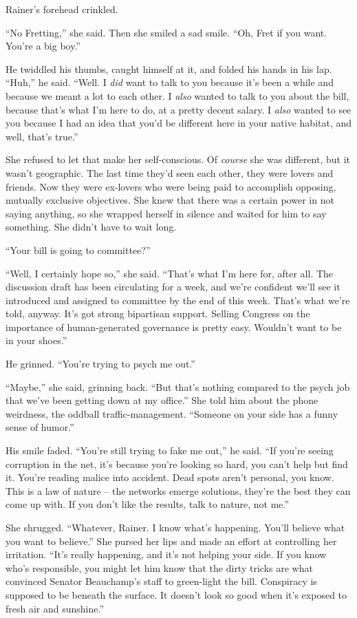 Rainer's forehead crinkled.

“No Fretting,” she said. Then she smiled a sad smile. “Oh, Fret 
if you want. You're a big boy.”

He twiddled his thumbs, caught himself at it, and folded his hands in 
his lap. “Huh,” he said. “Well. I \emph{did} want to talk to you 
because it's been a while and because we meant a lot to each other. I 
\emph{also} wanted to talk to you about the bill, because that's what 
I'm here to do, at a pretty decent salary. I \emph{also} wanted to see 
you because I had an idea that you'd be different here in your native 
habitat, and well, that's true.”

She refused to let that make her self-conscious. Of \emph{course} she 
was different, but it wasn't geographic. The last time they'd seen each 
other, they were lovers and friends. Now they were ex-lovers who were 
being paid to accomplish opposing, mutually exclusive objectives. She 
knew that there was a certain power in not saying anything, so she 
wrapped herself in silence and waited for him to say something. She 
didn't have to wait long.

“Your bill is going to committee?”

“Well, I certainly hope so,” she said. “That's what I'm here for, 
after all. The discussion draft has been circulating for a week, and 
we're confident we'll see it introduced and assigned to committee by 
the end of this week. That's what we're told, anyway. It's got strong 
bipartisan support. Selling Congress on the importance of 
human-generated governance is pretty easy. Wouldn't want to be in your 
shoes.”

He grinned. “You're trying to psych me out.”

“Maybe,” she said, grinning back. “But that's nothing compared to 
the psych job that we've been getting down at my office.” She told 
him about the phone weirdness, the oddball traffic-management. 
“Someone on your side has a funny sense of humor.”

His smile faded. “You're still trying to fake me out,” he said. 
“If you're seeing corruption in the net, it's because you're looking 
so hard, you can't help but find it. You're reading malice into 
accident. Dead spots aren't personal, you know. This is a law of nature 
-- the networks emerge solutions, they're the best they can come up 
with. If you don't like the results, talk to nature, not me.”

She shrugged. “Whatever, Rainer. I know what's happening. You'll 
believe what you want to believe.” She pursed her lips and made an 
effort at controlling her irritation. “It's really happening, and 
it's not helping your side. If you know who's responsible, you might 
let him know that the dirty tricks are what convinced Senator 
Beauchamp's staff to green-light the bill. Conspiracy is supposed to be 
beneath the surface. It doesn't look so good when it's exposed to fresh 
air and sunshine.”

